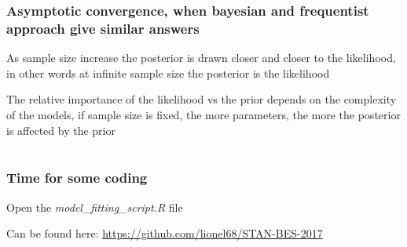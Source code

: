 \documentclass{beamer}
\begin{document}
  \begin{frame}
  \frametitle{\bf Asymptotic convergence, when bayesian and frequentist approach give similar answers}
  
  As sample size increase the posterior is drawn closer and closer to the likelihood, in other words at infinite sample size the posterior is the likelihood
  
  \vspace*{0.3cm}
  
  The relative importance of the likelihood vs the prior depends on the complexity of the models, if sample size is fixed, the more parameters, the more the posterior is affected by the prior
  
  
 \end{frame}
 
 \section*{}
 
 \begin{frame}
  \frametitle{\bf Time for some coding}
  
 \begin{center}
  Open the \textit{model\_fitting\_script.R} file
  
  \vspace*{1cm}
  
  Can be found here: \url{https://github.com/lionel68/STAN-BES-2017}
 \end{center}
 
\end{frame}
 
\end{document}
